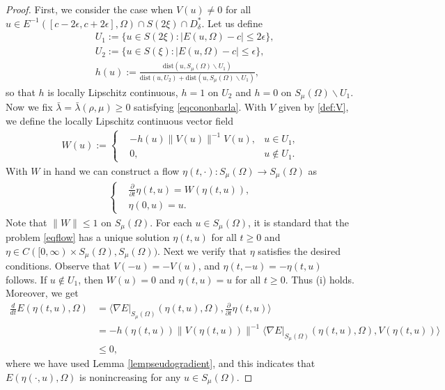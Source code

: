 \documentclass[10pt,a4paper]{article}
\theoremstyle{definition} \theoremstyle{remark}
\numberwithin{equation}{section}
\newcommand{\la}{\lambda}
\begin{document}
\begin{proof}
	First, we consider the case when $V(u) \neq 0$ for all $u \in E^{-1}([c-2\epsilon,c+2\epsilon],\Omega) \cap S(2\xi) \cap D^*_\delta$. Let us define
	\begin{align*}
		& U_1 := \bigl\{u \in S(2\xi): |E(u,\Omega)-c| \leq 2\epsilon \bigr\}, \\
		& U_2 := \bigl\{u \in S(\xi): |E(u,\Omega)-c| \leq \epsilon\bigr\}, \\
		& h(u):= \frac{\text{dist}(u,S_\mu(\Omega)\backslash U_1)}{\text{dist}(u,U_2)+\text{dist}(u,S_\mu(\Omega)\backslash U_1)},
	\end{align*}
	so that $h$ is locally Lipschitz continuous, $h = 1$ on $U_2$ and $h = 0$ on $S_\mu(\Omega)\backslash U_1$. Now we fix $\bar\la = \bar\la(\rho,\mu) \geq 0$ satisfying \eqref{eqcononbarla}. With $V$ given by \eqref{def:V}, we define the locally Lipschitz continuous vector field
	\begin{align*}
		W(u) :=
		\left\{
		\begin{aligned}
			& -h(u)\|V(u)\|^{-1}V(u), & u \in U_1, \\
			& 0, & u \notin U_1.
		\end{aligned}
		\right.
	\end{align*}
    With $W$ in hand we can construct a flow $\eta(t,\cdot) : S_\mu(\Omega) \to S_\mu(\Omega)$ as
    \begin{align} \label{eqflow}
    	\left\{
    	\begin{aligned}
    		& \frac{\partial}{\partial t}\eta(t,u) = W(\eta(t,u)), \\
    		& \eta(0,u) = u.
    	\end{aligned}
    	\right.
    \end{align}
    Note that $\|W\| \leq 1$ on $S_\mu(\Omega)$. For each $u \in S_\mu(\Omega)$, it is standard that the problem \eqref{eqflow} has a unique solution $\eta(t,u)$ for all $t \geq 0$ and $\eta \in C([0,\infty) \times S_\mu(\Omega), S_\mu(\Omega))$. Next we verify that $\eta$ satisfies the desired conditions. Observe that $V(-u) = -V(u)$, and $\eta(t,-u) = -\eta(t,u)$ follows. If $u \notin U_1$, then $W(u) = 0$ and $\eta(t,u) = u$ for all $t \geq 0$. Thus (i) holds. Moreover, we get
    \begin{align*}
    	\frac{d}{dt}E(\eta(t,u),\Omega) & = \langle \nabla E|_{S_\mu(\Omega)}(\eta(t,u),\Omega), \frac{\partial}{\partial t}\eta(t,u) \rangle \\
    	& = -h(\eta(t,u))\|V(\eta(t,u))\|^{-1}\langle \nabla E|_{S_\mu(\Omega)}(\eta(t,u),\Omega), V(\eta(t,u)) \rangle \\
    	& \leq 0,
    \end{align*}
	where we have used Lemma \ref{lempseudogradient}, and this indicates that $E(\eta(\cdot,u),\Omega)$ is nonincreasing for any $u \in S_\mu(\Omega)$.
	


\end{proof}
\end{document}
